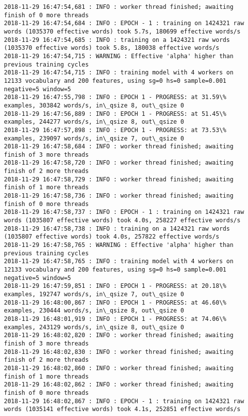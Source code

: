 \documentclass[11pt]{article}
\begin{document}
\begin{Verbatim}[commandchars=\\\{\}]
2018-11-29 16:47:54,681 : INFO : worker thread finished; awaiting finish of 0 more threads
2018-11-29 16:47:54,684 : INFO : EPOCH - 1 : training on 1424321 raw words (1035370 effective words) took 5.7s, 180699 effective words/s
2018-11-29 16:47:54,685 : INFO : training on a 1424321 raw words (1035370 effective words) took 5.8s, 180038 effective words/s
2018-11-29 16:47:54,715 : WARNING : Effective 'alpha' higher than previous training cycles
2018-11-29 16:47:54,715 : INFO : training model with 4 workers on 12133 vocabulary and 200 features, using sg=0 hs=0 sample=0.001 negative=5 window=5
2018-11-29 16:47:55,798 : INFO : EPOCH 1 - PROGRESS: at 31.59\% examples, 303842 words/s, in\_qsize 8, out\_qsize 0
2018-11-29 16:47:56,889 : INFO : EPOCH 1 - PROGRESS: at 51.45\% examples, 244277 words/s, in\_qsize 8, out\_qsize 0
2018-11-29 16:47:57,898 : INFO : EPOCH 1 - PROGRESS: at 73.53\% examples, 239097 words/s, in\_qsize 7, out\_qsize 0
2018-11-29 16:47:58,684 : INFO : worker thread finished; awaiting finish of 3 more threads
2018-11-29 16:47:58,720 : INFO : worker thread finished; awaiting finish of 2 more threads
2018-11-29 16:47:58,729 : INFO : worker thread finished; awaiting finish of 1 more threads
2018-11-29 16:47:58,736 : INFO : worker thread finished; awaiting finish of 0 more threads
2018-11-29 16:47:58,737 : INFO : EPOCH - 1 : training on 1424321 raw words (1035807 effective words) took 4.0s, 258227 effective words/s
2018-11-29 16:47:58,738 : INFO : training on a 1424321 raw words (1035807 effective words) took 4.0s, 257822 effective words/s
2018-11-29 16:47:58,765 : WARNING : Effective 'alpha' higher than previous training cycles
2018-11-29 16:47:58,765 : INFO : training model with 4 workers on 12133 vocabulary and 200 features, using sg=0 hs=0 sample=0.001 negative=5 window=5
2018-11-29 16:47:59,851 : INFO : EPOCH 1 - PROGRESS: at 20.18\% examples, 192747 words/s, in\_qsize 7, out\_qsize 0
2018-11-29 16:48:00,867 : INFO : EPOCH 1 - PROGRESS: at 46.60\% examples, 230444 words/s, in\_qsize 8, out\_qsize 0
2018-11-29 16:48:01,919 : INFO : EPOCH 1 - PROGRESS: at 74.06\% examples, 243129 words/s, in\_qsize 8, out\_qsize 0
2018-11-29 16:48:02,820 : INFO : worker thread finished; awaiting finish of 3 more threads
2018-11-29 16:48:02,830 : INFO : worker thread finished; awaiting finish of 2 more threads
2018-11-29 16:48:02,860 : INFO : worker thread finished; awaiting finish of 1 more threads
2018-11-29 16:48:02,862 : INFO : worker thread finished; awaiting finish of 0 more threads
2018-11-29 16:48:02,867 : INFO : EPOCH - 1 : training on 1424321 raw words (1035141 effective words) took 4.1s, 252851 effective words/s

\end{Verbatim}
\end{document}
